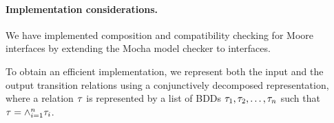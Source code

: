 \paragraph{Implementation considerations.}
%
We have implemented composition and compatibility checking for Moore
interfaces by extending the 
Mocha model checker \cite{Mocha98} to interfaces. 
\begin{comment}
To obtain an efficient implementation, it is important to use a
conjunctively decomposed representation for the BDDs representing the 
transition relations, and to derive the new input transition relation
for a composed interface again in conjunctively decomposed form. 
In fact, the (output) transition relation $\otrans$ 
of a module is best represented not as a single BDD, but
as a list of BDDs $\otrans_1, \otrans_2, \ldots, \otrans_n$, 
such that $\otrans = \bigwedge_{i=1}^n \otrans_i$: 
the BDDs $\otrans_1, \otrans_2, \ldots, \otrans_n$ are often
small, and can be constructed efficiently while parsing the input. 
For example, in {\em reactive modules\/} \cite{RM96journal} 
each $\otrans_i$, for $1 \leq i \leq  n$, can be obtained by parsing a
single {\em atom,} which describes the updates of only a handful of
variables;
a similar consideration holds for the input language of e.g.\ SMV
\cite{SMV96}. 
Furthermore, highly efficient {\em image computation techniques\/}
have been implemented for computing formulas of the form 
$\exists \vars . \bigwedge_{i=1}^n \otrans_i$; such techniques are at
the heart of symbolic reachability algorithms \cite{Ranjan97}.
We represent both the input and output transition relations of Moore
interfaces in conjunctively decomposed form, as lists of BDDs.
\end{comment}
%
To obtain an efficient implementation, we represent both the input and
the output transition relations %
using a conjunctively decomposed representation, where a relation
$\tau$ is represented by a list of BDDs $\tau_1, \tau_2,
\ldots, \tau_n$ such that $\tau = \wedge_{i=1}^n \tau_i$. 
